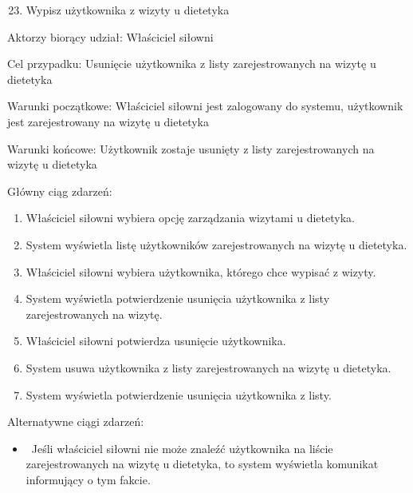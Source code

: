 {}

{}

\begin{enumerate}
\setcounter{enumi}{22}
\tightlist
\item
  {Wypisz użytkownika z wizyty u dietetyka}
\end{enumerate}

{Aktorzy biorący udział: Właściciel siłowni}

{Cel przypadku: Usunięcie użytkownika z listy zarejestrowanych na wizytę
u dietetyka}

{Warunki początkowe: Właściciel siłowni jest zalogowany do systemu,
użytkownik jest zarejestrowany na wizytę u dietetyka}

{Warunki końcowe: Użytkownik zostaje usunięty z listy zarejestrowanych
na wizytę u dietetyka}

{Główny ciąg zdarzeń:}

\begin{enumerate}
\tightlist
\item
  {Właściciel siłowni wybiera opcję zarządzania wizytami u dietetyka.}
\item
  {System wyświetla listę użytkowników zarejestrowanych na wizytę u
  dietetyka.}
\item
  {Właściciel siłowni wybiera użytkownika, którego chce wypisać z
  wizyty.}
\item
  {System wyświetla potwierdzenie usunięcia użytkownika z listy
  zarejestrowanych na wizytę.}
\item
  {Właściciel siłowni potwierdza usunięcie użytkownika.}
\item
  {System usuwa użytkownika z listy zarejestrowanych na wizytę u
  dietetyka.}
\item
  {System wyświetla potwierdzenie usunięcia użytkownika z listy.}
\end{enumerate}

{Alternatywne ciągi zdarzeń:}

\begin{itemize}
\tightlist
\item
  {~Jeśli właściciel siłowni nie może znaleźć użytkownika na liście
  zarejestrowanych na wizytę u dietetyka, to system wyświetla komunikat
  informujący o tym fakcie.}
\end{itemize}

{}

{}

{}

